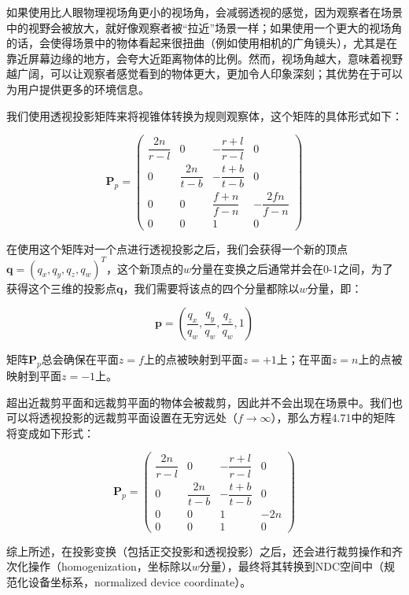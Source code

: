 \documentclass[
  paper=a4,
  ,captions=tableheading
]{scrartcl}
\begin{document}
如果使用比人眼物理视场角更小的视场角，会减弱透视的感觉，因为观察者在场景中的视野会被放大，就好像观察者被``拉近''场景一样；如果使用一个更大的视场角的话，会使得场景中的物体看起来很扭曲（例如使用相机的广角镜头），尤其是在靠近屏幕边缘的地方，会夸大近距离物体的比例。然而，视场角越大，意味着视野越广阔，可以让观察者感觉看到的物体更大，更加令人印象深刻；其优势在于可以为用户提供更多的环境信息。

我们使用透视投影矩阵来将视锥体转换为规则观察体，这个矩阵的具体形式如下：

\[
  \mathbf{P}_{p}=
  \left(\begin{array}{cccc}
      \dfrac{2 n}{r-l} & 0                & -\dfrac{r+l}{r-l} & 0                   \\[2mm]
      0                & \dfrac{2 n}{t-b} & -\dfrac{t+b}{t-b} & 0                   \\[2mm]
      0                & 0                & \dfrac{f+n}{f-n}  & -\dfrac{2 f n}{f-n} \\[2mm]
      0                & 0                & 1                 & 0
    \end{array}\right)
  \tag{4.71}
\]

在使用这个矩阵对一个点进行透视投影之后，我们会获得一个新的顶点\(\mathbf{q}=\left(q_{x}, q_{y}, q_{z}, q_{w}\right)^{T}\)，这个新顶点的\(w\)分量在变换之后通常并会在0-1之间，为了获得这个三维的投影点\(\mathbf{q}\)，我们需要将该点的四个分量都除以\(w\)分量，即：

\[
  \mathbf{p}=\left(
  \frac{q_{x}}{q_{w}},
  \frac{q_{y}}{q_{w}},
  \frac{q_{z}}{q_{w}},
  1\right)
  \tag{4.72}
\]

矩阵\(\mathbf{P}_{p}\)总会确保在平面\(z=f\)上的点被映射到平面\(z=+1\)上；在平面\(z=n\)上的点被映射到平面\(z=-1\)上。

超出近裁剪平面和远裁剪平面的物体会被裁剪，因此并不会出现在场景中。我们也可以将透视投影的远裁剪平面设置在无穷远处（\(f \rightarrow \infty\)），那么方程4.71中的矩阵将变成如下形式：

\[
  \mathbf{P}_{p}=\left(\begin{array}{cccc}\dfrac{2 n}{r-l} & 0 & -\dfrac{r+l}{r-l} & 0 \\ 0 & \dfrac{2 n}{t-b} & -\dfrac{t+b}{t-b} & 0 \\ 0 & 0 & 1 & -2 n \\ 0 & 0 & 1 & 0\end{array}\right)
  \tag{4.73}
\]

综上所述，在投影变换（包括正交投影和透视投影）之后，还会进行裁剪操作和齐次化操作（homogenization，坐标除以\(w\)分量），最终将其转换到NDC空间中（规范化设备坐标系，normalized
device coordinate）。
\end{document}
